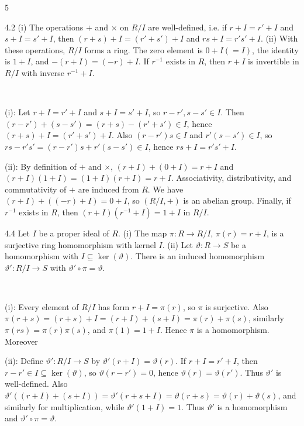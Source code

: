 \documentclass[8pt]{extarticle}
\makeatletter
\newcommand{\fitdisplay}[1]{%
  \par\vspace{-1pt}\noindent
  \sbox{\fitdisplaybox}{#1}%
  \makebox[\columnwidth][c]{%
    \ifdim\wd\fitdisplaybox>\columnwidth
      \resizebox{\columnwidth}{!}{#1}%
    \else
      \usebox{\fitdisplaybox}%
    \fi
  }%
  \par\vspace{-1pt}%
}
\renewenvironment{proof}[1][\proofname]{%
  \pushQED{\qed}%
  \par\noindent\normalfont\itshape #1\@addpunct{.}\ \normalfont\ignorespaces
}{%
  \popQED%
  \par
}
\makeatother
\begin{document}
\begin{multicols*}{5}
        \begin{lemma}{4.2}
            (i) The operations \(+\) and \(\times\) on \(R/I\) are well-defined, i.e. if \(r+I=r'+I\) and \(s+I=s'+I\), then \((r+s)+I=(r'+s')+I\) and \(rs+I=r's'+I\). (ii) With these operations, \(R/I\) forms a ring. The zero element is \(0+I(=I)\), the identity is \(1+I\), and \(-(r+I)=(-r)+I\). If \(r^{-1}\) exists in \(R\), then \(r+I\) is invertible in \(R/I\) with inverse \(r^{-1}+I\).
        \end{lemma}

        \begin{proof}
            (i): Let \(r+I=r'+I\) and \(s+I=s'+I\), so \(r-r',s-s'\in I\). Then \((r-r')+(s-s')=(r+s)-(r'+s')\in I\), hence \((r+s)+I=(r'+s')+I\). Also \((r-r')s\in I\) and \(r'(s-s')\in I\), so \(rs-r's'=(r-r')s+r'(s-s')\in I\), hence \(rs+I=r's'+I\).

            (ii): By definition of \(+\) and \(\times\), \((r+I)+(0+I)=r+I\) and \((r+I)(1+I)=(1+I)(r+I)=r+I\). Associativity, distributivity, and commutativity of \(+\) are induced from \(R\). We have \((r+I)+((-r)+I)=0+I\), so \((R/I,+)\) is an abelian group. Finally, if \(r^{-1}\) exists in \(R\), then \((r+I)(r^{-1}+I)=1+I\) in \(R/I\).
        \end{proof}

        \begin{lemma}{4.4}
            Let \(I\) be a proper ideal of \(R\). (i) The map \(\pi:R\to R/I\), \(\pi(r)=r+I\), is a surjective ring homomorphism with kernel \(I\). (ii) Let \(\vartheta:R\to S\) be a homomorphism with \(I\subseteq\ker(\vartheta)\). There is an induced homomorphism \(\vartheta':R/I\to S\) with \(\vartheta'\circ\pi=\vartheta\).
        \end{lemma}

        \begin{proof}
            (i): Every element of \(R/I\) has form \(r+I=\pi(r)\), so \(\pi\) is surjective. Also \(\pi(r+s)=(r+s)+I=(r+I)+(s+I)=\pi(r)+\pi(s)\), similarly \(\pi(rs)=\pi(r)\pi(s)\), and \(\pi(1)=1+I\). Hence \(\pi\) is a homomorphism. Moreover
            \fitdisplay{\(\ker(\pi)=\{r\in R:\pi(r)=0+I\}=\{r\in R:r+I=I\}=I.\)}

            (ii): Define \(\vartheta':R/I\to S\) by \(\vartheta'(r+I)=\vartheta(r)\). If \(r+I=r'+I\), then \(r-r'\in I\subseteq\ker(\vartheta)\), so \(\vartheta(r-r')=0\), hence \(\vartheta(r)=\vartheta(r')\). Thus \(\vartheta'\) is well-defined. Also \(\vartheta'((r+I)+(s+I))=\vartheta'(r+s+I)=\vartheta(r+s)=\vartheta(r)+\vartheta(s)\), and similarly for multiplication, while \(\vartheta'(1+I)=1\). Thus \(\vartheta'\) is a homomorphism and \(\vartheta'\circ\pi=\vartheta\).
        \end{proof}


\end{multicols*}
\end{document}
